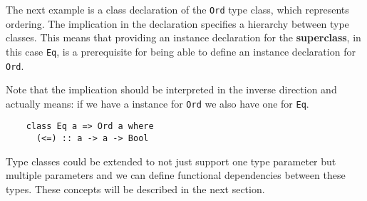 The next example is a class declaration of the \texttt{Ord} type class, which
represents ordering. The implication in the declaration specifies a hierarchy
between type classes. This means that providing an instance declaration for the
\textbf{superclass}, in this case \texttt{Eq}, is a prerequisite for being
able to define an instance declaration for \texttt{Ord}.

Note that the implication should be interpreted in the inverse direction and
actually means: if we have a instance for \texttt{Ord} we also have one for
\texttt{Eq}.
\begin{verbatim}
    class Eq a => Ord a where
      (<=) :: a -> a -> Bool
\end{verbatim}

Type classes could be extended to not just support one type parameter but
multiple parameters and we can define functional dependencies between these
types. These concepts will be described in the next section.
